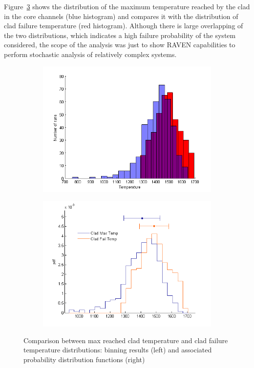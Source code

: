 \documentclass{mc2013}
\begin{document}
Figure~\ref{fig:distributionResults} shows the distribution of the maximum temperature reached by the clad in the core channels (blue histogram) and compares it with the distribution of clad failure temperature (red histogram).
Although there is large overlapping of the two distributions, which indicates a high failure probability of the system considered, the scope of the analysis was just to show  RAVEN capabilities to perform stochastic analysis of relatively complex systems.
\begin{figure} [H]
\centering
\begin{subfigure}{.5\textwidth}
  \centering
  \includegraphics[width=1\linewidth]{figures/PRA_dist1.png}
  \label{fig:runs_temp_dist}
\end{subfigure}%
\begin{subfigure}{.5\textwidth}
  \centering
  \includegraphics[width=1\linewidth]{figures/PRA_dist2.png}
  \label{fig:pdf_temp}
\end{subfigure}
\caption{Comparison between max reached clad temperature and clad failure temperature distributions: binning results (left) and associated probability distribution functions (right)}
\label{fig:distributionResults}
\end{figure}
\end{document}
